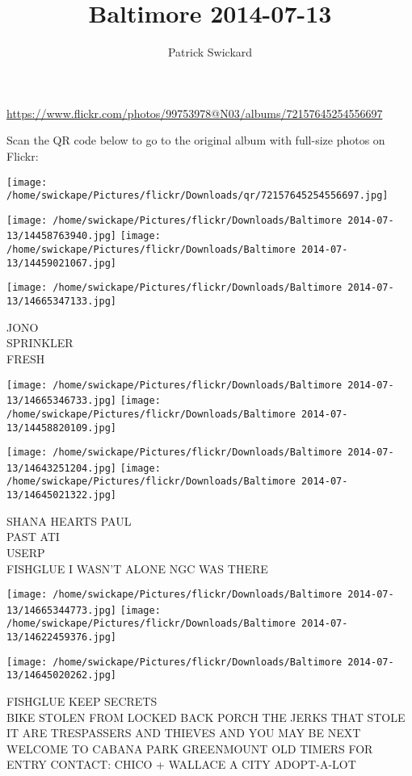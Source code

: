 \documentclass[10pt,letterpaper]{article}
\title{Baltimore 2014-07-13}
\author{Patrick Swickard}
\date{}
\begin{document}
\maketitle

\url{https://www.flickr.com/photos/99753978@N03/albums/72157645254556697}

Scan the QR code below to go to the original album with full-size photos on Flickr:

\texttt{[image: /home/swickape/Pictures/flickr/Downloads/qr/72157645254556697.jpg]}
\pagebreak

\texttt{[image: /home/swickape/Pictures/flickr/Downloads/Baltimore 2014-07-13/14458763940.jpg]}
\texttt{[image: /home/swickape/Pictures/flickr/Downloads/Baltimore 2014-07-13/14459021067.jpg]}

\vspace{0.25in}
\texttt{[image: /home/swickape/Pictures/flickr/Downloads/Baltimore 2014-07-13/14665347133.jpg]}

JONO\\
SPRINKLER\\
FRESH
\pagebreak

\texttt{[image: /home/swickape/Pictures/flickr/Downloads/Baltimore 2014-07-13/14665346733.jpg]}
\texttt{[image: /home/swickape/Pictures/flickr/Downloads/Baltimore 2014-07-13/14458820109.jpg]}

\texttt{[image: /home/swickape/Pictures/flickr/Downloads/Baltimore 2014-07-13/14643251204.jpg]}
\texttt{[image: /home/swickape/Pictures/flickr/Downloads/Baltimore 2014-07-13/14645021322.jpg]}

SHANA HEARTS PAUL\\
PAST ATI\\
USERP\\
FISHGLUE I WASN'T ALONE NGC WAS THERE
\pagebreak

\texttt{[image: /home/swickape/Pictures/flickr/Downloads/Baltimore 2014-07-13/14665344773.jpg]}
\texttt{[image: /home/swickape/Pictures/flickr/Downloads/Baltimore 2014-07-13/14622459376.jpg]}

\vspace{0.25in}
\texttt{[image: /home/swickape/Pictures/flickr/Downloads/Baltimore 2014-07-13/14645020262.jpg]}

FISHGLUE KEEP SECRETS\\
BIKE STOLEN FROM LOCKED BACK PORCH THE JERKS THAT STOLE IT ARE TRESPASSERS AND THIEVES AND YOU MAY BE NEXT\\
WELCOME TO CABANA PARK GREENMOUNT OLD TIMERS FOR ENTRY CONTACT: CHICO + WALLACE A CITY ADOPT{-}A{-}LOT
\pagebreak
\end{document}
